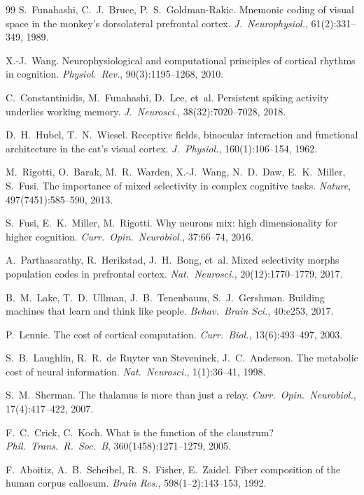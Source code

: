 \documentclass[11pt,a4paper]{article}
\begin{document}
\begin{thebibliography}{99}
S.~Funahashi, C.~J.~Bruce, P.~S.~Goldman-Rakic.
Mnemonic coding of visual space in the monkey's dorsolateral
prefrontal cortex.
\emph{J.\ Neurophysiol.}, 61(2):331--349, 1989.

X.-J.~Wang.
Neurophysiological and computational principles of cortical rhythms
in cognition.
\emph{Physiol.\ Rev.}, 90(3):1195--1268, 2010.

C.~Constantinidis, M.~Funahashi, D.~Lee, et~al.
Persistent spiking activity underlies working memory.
\emph{J.\ Neurosci.}, 38(32):7020--7028, 2018.

D.~H.~Hubel, T.~N.~Wiesel.
Receptive fields, binocular interaction and functional architecture
in the cat's visual cortex.
\emph{J.\ Physiol.}, 160(1):106--154, 1962.

M.~Rigotti, O.~Barak, M.~R.~Warden, X.-J.~Wang, N.~D.~Daw,
E.~K.~Miller, S.~Fusi.
The importance of mixed selectivity in complex cognitive tasks.
\emph{Nature}, 497(7451):585--590, 2013.

S.~Fusi, E.~K.~Miller, M.~Rigotti.
Why neurons mix: high dimensionality for higher cognition.
\emph{Curr.\ Opin.\ Neurobiol.}, 37:66--74, 2016.

A.~Parthasarathy, R.~Herikstad, J.~H.~Bong, et~al.
Mixed selectivity morphs population codes in prefrontal cortex.
\emph{Nat.\ Neurosci.}, 20(12):1770--1779, 2017.

B.~M.~Lake, T.~D.~Ullman, J.~B.~Tenenbaum, S.~J.~Gershman.
Building machines that learn and think like people.
\emph{Behav.\ Brain Sci.}, 40:e253, 2017.

P.~Lennie.
The cost of cortical computation.
\emph{Curr.\ Biol.}, 13(6):493--497, 2003.

S.~B.~Laughlin, R.~R.~de Ruyter van Steveninck, J.~C.~Anderson.
The metabolic cost of neural information.
\emph{Nat.\ Neurosci.}, 1(1):36--41, 1998.

S.~M.~Sherman.
The thalamus is more than just a relay.
\emph{Curr.\ Opin.\ Neurobiol.}, 17(4):417--422, 2007.

F.~C.~Crick, C.~Koch.
What is the function of the claustrum?
\emph{Phil.\ Trans.\ R.\ Soc.\ B}, 360(1458):1271--1279, 2005.

F.~Aboitiz, A.~B.~Scheibel, R.~S.~Fisher, E.~Zaidel.
Fiber composition of the human corpus callosum.
\emph{Brain Res.}, 598(1--2):143--153, 1992.


\end{thebibliography}
\end{document}
